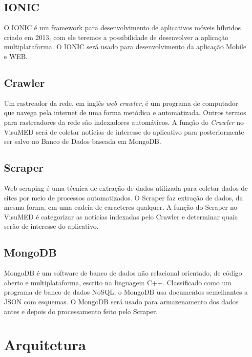 \documentclass[
	12pt,				%
	openright,			%
	twoside,			%
	a4paper,			%
	english,			%
	french,				%
	spanish,			%
	brazil,				%
	]{abntex2}
\begin{document}
\section*{IONIC}

O IONIC é um framework para desenvolvimento de aplicativos móveis híbridos criado em 2013, com ele teremos a possibilidade de desenvolver a aplicação multiplataforma. O IONIC  será usado para desenvolvimento da aplicação Mobile e WEB. 

\section*{Crawler}

Um rastreador da rede, em inglês \textit{web crawler}, é um programa de computador que navega pela internet de uma forma metódica e automatizada. Outros termos para rastreadores da rede são indexadores automáticos. A função do \textit{Crawler} no VisuMED será de coletar notícias de interesse do aplicativo para posteriormente ser salvo no Banco de Dados baseada em MongoDB.

\section*{Scraper}

Web scraping é uma técnica de extração de dados utilizada para coletar dados de sites por meio de processos automatizados. O Scraper faz extração de dados, da mesma forma, em uma cadeia de caracteres qualquer. A função do Scraper no VisuMED é categorizar as notícias indexadas pelo Crawler e determinar quais serão de interesse do aplicativo.

\section*{MongoDB}

MongoDB é um software de banco de dados não relacional orientado, de código aberto e multiplataforma, escrito na linguagem C++. Classificado como um programa de banco de dados NoSQL, o MongoDB usa documentos semelhantes a JSON com esquemas. O MongoDB será usado para armazenamento dos dados antes e depois do processamento feito pelo Scraper.


\chapter{Arquitetura}
\end{document}
